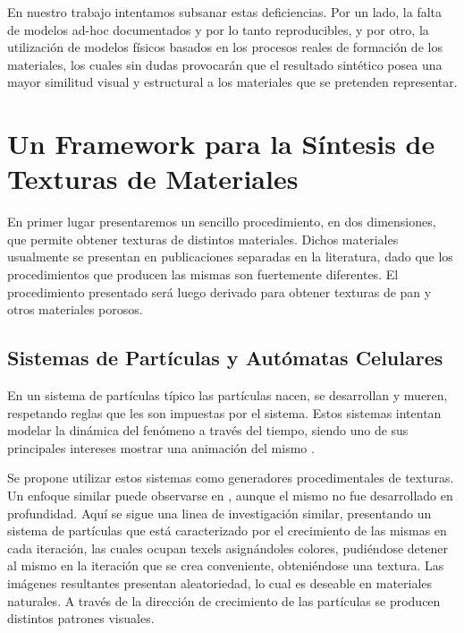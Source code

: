 \documentclass[spanish,a4paper,11pt,oneside,links]{report}
\begin{document}
En nuestro trabajo intentamos subsanar estas deficiencias.
Por un lado, la falta de modelos ad-hoc documentados y por lo tanto reproducibles, y por otro, la utilización de modelos físicos basados en los procesos reales de formación de los materiales, los cuales sin dudas provocarán que el resultado sintético posea una mayor similitud visual y estructural a los materiales que se pretenden representar.

\section{Un Framework para la Síntesis de Texturas de Materiales}
En primer lugar presentaremos un sencillo procedimiento, en dos dimensiones, que permite obtener texturas de distintos materiales.
Dichos materiales usualmente se presentan en publicaciones separadas en la literatura, dado que los procedimientos que producen las mismas son fuertemente diferentes.
El procedimiento presentado ser\'a luego derivado para obtener texturas de pan y otros materiales porosos.


\subsection{Sistemas de Partículas y Autómatas Celulares}
En un sistema de part\'iculas t\'ipico las part\'iculas nacen, se desarrollan y mueren, respetando reglas que les son impuestas por el sistema. Estos sistemas intentan modelar la din\'amica del fen\'omeno a trav\'es del tiempo, siendo uno de sus principales intereses mostrar una animaci\'on del mismo \cite{Gao2010, Bagar2010, Lentine2010}.

Se propone utilizar estos sistemas como generadores procedimentales de texturas. Un enfoque similar puede observarse en \cite{Kranidotis98}, aunque el mismo no fue desarrollado en profundidad.
Aquí se sigue una linea de investigaci\'on similar, presentando un sistema de part\'iculas que est\'a caracterizado por el crecimiento de las mismas en cada iteraci\'on, las cuales ocupan texels asign\'andoles colores, pudi\'endose detener al mismo en la iteraci\'on que se crea conveniente, obteni\'endose una textura.
Las im\'agenes resultantes presentan aleatoriedad, lo cual es deseable en materiales naturales.
A trav\'es de la direcci\'on de crecimiento de las part\'iculas se producen distintos patrones visuales.
\end{document}
